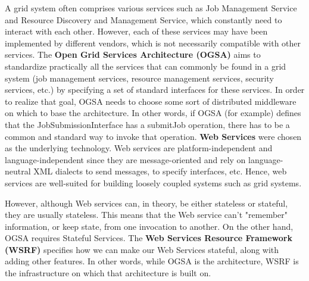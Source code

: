 \documentclass[9pt,twocolumn,twoside]{../../styles/osajnl}
\begin{document}
A grid system often comprises various services such as Job Management Service and Resource Discovery and Management Service, which constantly need to interact with each other. However, each of these services may have been implemented by different vendors, which is not necessarily compatible with other services. The \textbf{Open Grid Services Architecture (OGSA)} aims to standardize practically all the services that can commonly be found in a
grid system (job management services, resource management services, security services, etc.) by specifying a set of standard interfaces for these services.
In order to realize that goal, OGSA needs to choose some sort of distributed middleware on which to base the architecture. In other words, if OGSA (for example) defines that the JobSubmissionInterface has a submitJob operation, there has to be a common and standard way to invoke that operation. \textbf{Web Services} were chosen as the underlying technology. Web services are platform-independent and language-independent since they are message-oriented and rely on language-neutral XML dialects to send messages, to specify interfaces, etc. Hence, web services are well-suited for building loosely coupled systems such as grid systems.

However, although Web services can, in theory, be either stateless or stateful, they are usually stateless. This means that the Web service can’t "remember" information, or keep state, from one invocation to another. On the other hand, OGSA requires Stateful Services. 
The \textbf{Web Services Resource Framework (WSRF)} specifies how we can make our Web Services stateful, along with adding other features. In other words, while OGSA is the architecture, WSRF is the infrastructure on which that architecture is built on.
\end{document}
